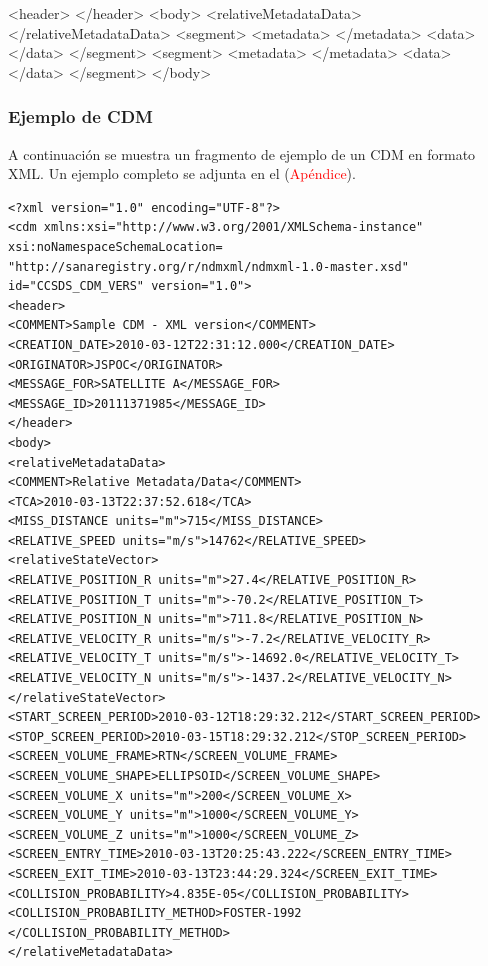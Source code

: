 \begin{verbbox}
<header>
</header>
<body>
  <relativeMetadataData>
  </relativeMetadataData>
  <segment>
    <metadata>
    </metadata>
    <data>
    </data>
  </segment>
  <segment>
    <metadata>
    </metadata>
    <data>
    </data>
  </segment>
</body>\\
\end{verbbox}

\begin{center}
\end{center}


\subsubsection{Ejemplo de CDM}
A continuaci\'on se muestra un fragmento de ejemplo de un CDM en formato XML. Un ejemplo completo se adjunta en el (\textcolor{red}{Ap\'endice}).\\

\begin{mdframed}
\lstset{language=XML}
\begin{lstlisting}
<?xml version="1.0" encoding="UTF-8"?>
<cdm xmlns:xsi="http://www.w3.org/2001/XMLSchema-instance"
xsi:noNamespaceSchemaLocation=
"http://sanaregistry.org/r/ndmxml/ndmxml-1.0-master.xsd"
id="CCSDS_CDM_VERS" version="1.0">
<header>
<COMMENT>Sample CDM - XML version</COMMENT>
<CREATION_DATE>2010-03-12T22:31:12.000</CREATION_DATE>
<ORIGINATOR>JSPOC</ORIGINATOR>
<MESSAGE_FOR>SATELLITE A</MESSAGE_FOR>
<MESSAGE_ID>20111371985</MESSAGE_ID>
</header>
<body>
<relativeMetadataData>
<COMMENT>Relative Metadata/Data</COMMENT>
<TCA>2010-03-13T22:37:52.618</TCA>
<MISS_DISTANCE units="m">715</MISS_DISTANCE>
<RELATIVE_SPEED units="m/s">14762</RELATIVE_SPEED>
<relativeStateVector>
<RELATIVE_POSITION_R units="m">27.4</RELATIVE_POSITION_R>
<RELATIVE_POSITION_T units="m">-70.2</RELATIVE_POSITION_T>
<RELATIVE_POSITION_N units="m">711.8</RELATIVE_POSITION_N>
<RELATIVE_VELOCITY_R units="m/s">-7.2</RELATIVE_VELOCITY_R>
<RELATIVE_VELOCITY_T units="m/s">-14692.0</RELATIVE_VELOCITY_T>
<RELATIVE_VELOCITY_N units="m/s">-1437.2</RELATIVE_VELOCITY_N>
</relativeStateVector>
<START_SCREEN_PERIOD>2010-03-12T18:29:32.212</START_SCREEN_PERIOD>
<STOP_SCREEN_PERIOD>2010-03-15T18:29:32.212</STOP_SCREEN_PERIOD>
<SCREEN_VOLUME_FRAME>RTN</SCREEN_VOLUME_FRAME>
<SCREEN_VOLUME_SHAPE>ELLIPSOID</SCREEN_VOLUME_SHAPE>
<SCREEN_VOLUME_X units="m">200</SCREEN_VOLUME_X>
<SCREEN_VOLUME_Y units="m">1000</SCREEN_VOLUME_Y>
<SCREEN_VOLUME_Z units="m">1000</SCREEN_VOLUME_Z>
<SCREEN_ENTRY_TIME>2010-03-13T20:25:43.222</SCREEN_ENTRY_TIME>
<SCREEN_EXIT_TIME>2010-03-13T23:44:29.324</SCREEN_EXIT_TIME>
<COLLISION_PROBABILITY>4.835E-05</COLLISION_PROBABILITY>
<COLLISION_PROBABILITY_METHOD>FOSTER-1992
</COLLISION_PROBABILITY_METHOD>
</relativeMetadataData>
\end{lstlisting}
\end{mdframed}

